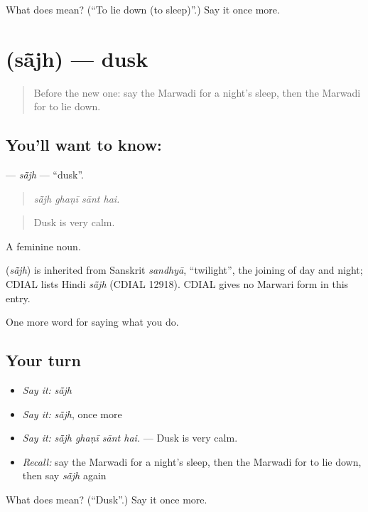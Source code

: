 \begin{tcolorbox}[breakable,colback=teal!4,colframe=teal!35!black,title={Before you move on}]
What does  mean? (\textquotedblleft{}To lie down (to sleep)\textquotedblright{}.) Say it once more.
\end{tcolorbox}
\section[\texorpdfstring{\mw{सांझ} (sā̃jh)}{सांझ (sā̃jh)}]{ (sā̃jh) — dusk}

\label{lesson:MW-C166-sajh}



\begin{quote}
Before the new one: say the Marwadi for a night's sleep, then the Marwadi for to lie down.
\end{quote}

\subsection*{You'll want to know: }
\textbf{} — \emph{sā̃jh} — \textquotedblleft{}dusk\textquotedblright{}.

\begin{quote}
   
\end{quote}

\begin{quote}
\emph{sā̃jh ghaṇī sānt hai.}
\end{quote}

\begin{quote}
Dusk is very calm.
\end{quote}

A feminine noun.

\begin{cousinweb}
\textbf{} (\emph{sā̃jh}) is inherited from Sanskrit \emph{sandhyā}, \textquotedblleft{}twilight\textquotedblright{}, the joining of day and night; CDIAL lists Hindi \emph{sā̃jh} (CDIAL 12918). CDIAL gives no Marwari form in this entry.
\end{cousinweb}

\begin{grammarlens}[title={What you've built}]
One more word for saying what you do.
\end{grammarlens}

\subsection*{Your turn}
\begin{itemize}
\raggedright
  \item \emph{Say it:} \emph{sā̃jh}
  \item \emph{Say it:} \emph{sā̃jh}, once more
  \item \emph{Say it:} \emph{sā̃jh ghaṇī sānt hai.} — Dusk is very calm.
  \item \emph{Recall:} say the Marwadi for a night's sleep, then the Marwadi for to lie down, then say \emph{sā̃jh} again
\end{itemize}

\begin{tcolorbox}[breakable,colback=teal!4,colframe=teal!35!black,title={Before you move on}]
What does  mean? (\textquotedblleft{}Dusk\textquotedblright{}.) Say it once more.
\end{tcolorbox}
